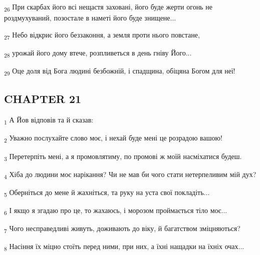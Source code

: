 \begin{tcolorbox}
\textsubscript{26} При скарбах його всі нещастя заховані, його буде жерти огонь не роздмухуваний, позостале в наметі його буде знищене...
\end{tcolorbox}
\begin{tcolorbox}
\textsubscript{27} Небо відкриє його беззаконня, а земля проти нього повстане,
\end{tcolorbox}
\begin{tcolorbox}
\textsubscript{28} урожай його дому втече, розпливеться в день гніву Його...
\end{tcolorbox}
\begin{tcolorbox}
\textsubscript{29} Оце доля від Бога людині безбожній, і спадщина, обіцяна Богом для неї!
\end{tcolorbox}
\subsection{CHAPTER 21}
\begin{tcolorbox}
\textsubscript{1} А Йов відповів та й сказав:
\end{tcolorbox}
\begin{tcolorbox}
\textsubscript{2} Уважно послухайте слово моє, і нехай буде мені це розрадою вашою!
\end{tcolorbox}
\begin{tcolorbox}
\textsubscript{3} Перетерпіть мені, а я промовлятиму, по промові ж моїй насміхатися будеш.
\end{tcolorbox}
\begin{tcolorbox}
\textsubscript{4} Хіба до людини моє нарікання? Чи не мав би чого стати нетерпеливим мій дух?
\end{tcolorbox}
\begin{tcolorbox}
\textsubscript{5} Оберніться до мене й жахніться, та руку на уста свої покладіть...
\end{tcolorbox}
\begin{tcolorbox}
\textsubscript{6} І якщо я згадаю про це, то жахаюсь, і морозом проймається тіло моє...
\end{tcolorbox}
\begin{tcolorbox}
\textsubscript{7} Чого несправедливі живуть, доживають до віку, й багатством зміцняються?
\end{tcolorbox}
\begin{tcolorbox}
\textsubscript{8} Насіння їх міцно стоїть перед ними, при них, а їхні нащадки на їхніх очах...
\end{tcolorbox}
